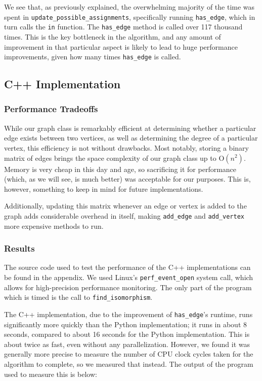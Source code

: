 \documentclass{article}
\begin{document}
  We see that, as previously explained, the overwhelming majority of the time was spent in \texttt{update\_possible\_assignments}, specifically running \texttt{has\_edge}, which in turn calls the \texttt{in} function. The \texttt{has\_edge} method is called over 117 thousand times. This is the key bottleneck in the algorithm, and any amount of improvement in that particular aspect is likely to lead to huge performance improvements, given how many times \texttt{has\_edge} is called.

  \subsection{C++ Implementation}

    \subsubsection{Performance Tradeoffs}
    While our graph class is remarkably efficient at determining whether a particular edge exists between two vertices, as well as determining the degree of a particular vertex, this efficiency is not without drawbacks. Most notably, storing a binary matrix of edges brings the space complexity of our graph class up to O$(n^2)$. Memory is very cheap in this day and age, so sacrificing it for performance (which, as we will see, is much better) was acceptable for our purposes. This is, however, something to keep in mind for future implementations.

    Additionally, updating this matrix whenever an edge or vertex is added to the graph adds considerable overhead in itself, making \texttt{add\_edge} and \texttt{add\_vertex} more expensive methods to run.

    \subsubsection{Results}
    The source code used to test the performance of the C++ implementations can be found in the appendix. We used Linux's \texttt{perf\_event\_open} system call, which allows for high-precision performance monitoring. The only part of the program which is timed is the call to \texttt{find\_isomorphism}.

    The C++ implementation, due to the improvement of \texttt{has\_edge}'s runtime, runs significantly more quickly than the Python implementation; it runs in about 8 seconds, compared to about 16 seconds for the Python implementation. This is about twice as fast, even without any parallelization. However, we found it was generally more precise to measure the number of CPU clock cycles taken for the algorithm to complete, so we measured that instead. The output of the program used to measure this is below:
\end{document}
